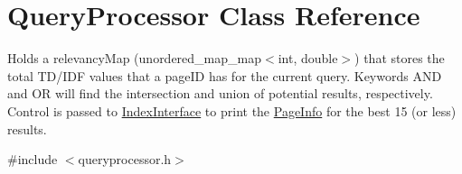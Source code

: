 \hypertarget{class_query_processor}{}\section{Query\+Processor Class Reference}
\label{class_query_processor}


Holds a relevancy\+Map (unordered\+\_\+map\+\_\+map$<$int, double$>$) that stores the total T\+D/\+I\+D\+F values that a page\+I\+D has for the current query. Keywords A\+N\+D and O\+R will find the intersection and union of potential results, respectively. Control is passed to \hyperlink{class_index_interface}{Index\+Interface} to print the \hyperlink{class_page_info}{Page\+Info} for the best 15 (or less) results.  




{\ttfamily \#include $<$queryprocessor.\+h$>$}

